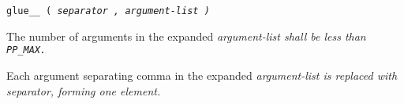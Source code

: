 
\tt{glue__ (} \it{separator} \tt{,} \it{argument-list} \tt{)}


The number of arguments in the expanded
\it{argument-list} shall be less than \tt{PP_MAX}.


Each argument separating comma in the expanded \it{argument-list}
is replaced with \it{separator}, forming one element.
